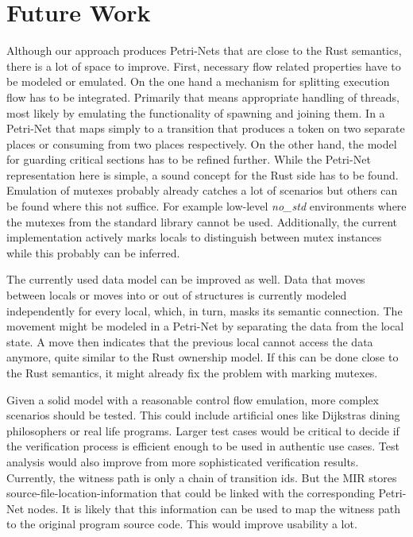 \chapter{Future Work}
\label{future}
Although our approach produces Petri-Nets that are close to the Rust semantics, there is a lot of space to improve.
First, necessary flow related properties have to be modeled or emulated.
On the one hand a mechanism for splitting execution flow has to be integrated.
Primarily that means appropriate handling of threads, most likely by emulating the functionality of spawning and joining them.
In a Petri-Net that maps simply to a transition that produces a token on two separate places or consuming from two places respectively.
On the other hand, the model for guarding critical sections has to be refined further.
While the Petri-Net representation here is simple, a sound concept for the Rust side has to be found.
Emulation of mutexes probably already catches a lot of scenarios but others can be found where this not suffice.
For example low-level \textit{no\_std} environments where the mutexes from the standard library cannot be used.
Additionally, the current implementation actively marks locals to distinguish between mutex instances while this probably can be inferred.

The currently used data model can be improved as well.
Data that moves between locals or moves into or out of structures is currently modeled independently for every local, which, in turn, masks its semantic connection.
The movement might be modeled in a Petri-Net by separating the data from the local state.
A move then indicates that the previous local cannot access the data anymore, quite similar to the Rust ownership model.
If this can be done close to the Rust semantics, it might already fix the problem with marking mutexes.

Given a solid model with a reasonable control flow emulation, more complex scenarios should be tested.
This could include artificial ones like Dijkstras dining philosophers \cite{dijkstra1971hierarchical} or real life programs.
Larger test cases would be critical to decide if the verification process is efficient enough to be used in authentic use cases.
Test analysis would also improve from more sophisticated verification results.
Currently, the witness path is only a chain of transition ids.
But the MIR stores source-file-location-information that could be linked with the corresponding Petri-Net nodes.
It is likely that this information can be used to map the witness path to the original program source code.
This would improve usability a lot.

